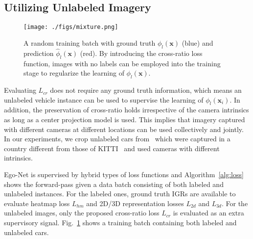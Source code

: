\documentclass[final]{cvpr}
\begin{document}
\subsection{Utilizing Unlabeled Imagery}
\begin{figure}[h]
	\begin{center}
\texttt{[image: ./figs/mixture.png]}
	\end{center}
	\caption{A random training batch with ground truth $\phi_l(\mathbf{x})$ (blue) and prediction $\hat{\phi}_l(\mathbf{x})$ (red). By introducing the cross-ratio loss function, images with no labels can be employed into the training stage to regularize the learning of $\phi_l(\mathbf{x})$.}
\label{fig:mixture}
\end{figure}
Evaluating $L_{cr}$ does not require any ground truth information, which means an unlabeled vehicle instance can be used to supervise the learning of $\phi_l(\mathbf{x}_i)$. In addition, the preservation of cross-ratio holds irrespective of the camera intrinsics as long as a center projection model is used. This implies that imagery captured with different cameras at different locations can be used collectively and jointly. In our experiments, we crop unlabeled cars from~\cite{song2019apollocar3d} which were captured in a country different from those of KITTI~\cite{geiger2012we} and used cameras with different intrinsics. 

Ego-Net is supervised by hybrid types of loss functions and Algorithm~\ref{alg:loss} shows the forward-pass given a data batch consisting of both labeled and unlabeled instances. For the labeled ones, ground truth IGRs are available to evaluate heatmap loss $L_{hm}$ and 2D/3D representation losses $L_{2d}$ and $L_{3d}$. For the unlabeled images, only the proposed cross-ratio loss $L_{cr}$ is evaluated as an extra supervisory signal. Fig.~\ref{fig:mixture} shows a training batch containing both labeled and unlabeled cars. 
\end{document}
